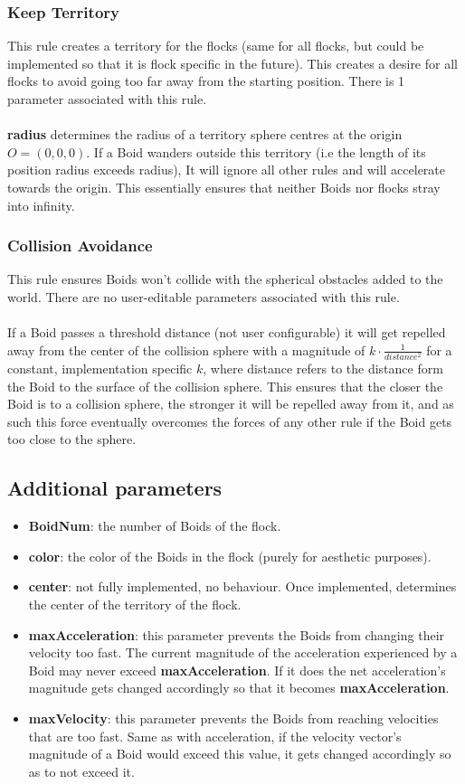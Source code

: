 \documentclass[12pt]{article}
\begin{document}
\subsubsection{Keep Territory}
This rule creates a territory for the flocks (same for all flocks, but could be implemented so that it is flock specific in the future). This creates a desire for all flocks to avoid going too far away from the starting position. There is 1 parameter associated with this rule.
\\ \\
\textbf{radius} determines the radius of a territory sphere centres at the origin $O=(0,0,0)$. If a Boid wanders outside this territory (i.e the length of its position radius exceeds radius), It will ignore all other rules and will accelerate towards the origin. This essentially ensures that neither Boids nor flocks stray into infinity.

\subsubsection{Collision Avoidance}
This rule ensures Boids won't collide with the spherical obstacles added to the world. There are no user-editable parameters associated with this  rule.
\\ \\
If a Boid passes a threshold distance (not user configurable) it will get repelled away from the center of the collision sphere with a magnitude of $k\cdot \frac{1}{distance^2}$ for a constant, implementation specific $k$, where distance refers to the distance form the Boid to the surface of the collision sphere. This ensures that the closer the Boid is to a collision sphere, the stronger it will be repelled away from it, and as such this force eventually overcomes the forces of any other rule if the Boid gets too close to the sphere.

\subsection{Additional parameters}
\begin{itemize}
	\item \textbf{BoidNum}: the number of Boids of the flock.
	\item \textbf{color}: the color of the Boids in the flock (purely for aesthetic purposes).
	\item \textbf{center}: not fully implemented, no behaviour. Once implemented, determines the center of the territory of the flock.
	\item \textbf{maxAcceleration}: this parameter prevents the Boids from changing their velocity too fast. The current magnitude of the acceleration experienced by a Boid may never exceed \textbf{maxAcceleration}. If it does the net acceleration's magnitude gets changed accordingly so that it becomes \textbf{maxAcceleration}.
	\item \textbf{maxVelocity}: this parameter prevents the Boids from reaching velocities that are too fast. Same as with acceleration, if the velocity vector's magnitude of a Boid would exceed this value, it gets changed accordingly so as to not exceed it. 
\end{itemize}
\end{document}
